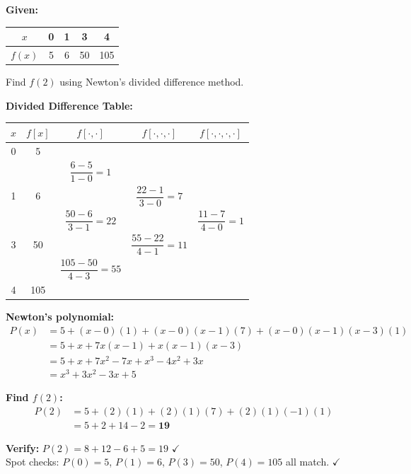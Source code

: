 \documentclass[12pt]{article}
\begin{document}
\begin{exbox}
\textbf{Given:}
\begin{center}
\begin{tabular}{|c|c|c|c|c|}
  \hline
  \rowcolor{primary!80}
  {\color{white}$x$} & {\color{white}0} & {\color{white}1} & {\color{white}3} & {\color{white}4} \\
  \hline
  $f(x)$ & 5 & 6 & 50 & 105 \\
  \hline
\end{tabular}
\end{center}
Find $f(2)$ using Newton's divided difference method.

\medskip\textbf{Divided Difference Table:}
\begin{center}
\renewcommand{\arraystretch}{1.4}
\begin{tabular}{|c|c|c|c|c|}
  \hline
  \rowcolor{primary!80}
  {\color{white}$x$} & {\color{white}$f[x]$} &
  {\color{white}$f[\cdot,\cdot]$} & {\color{white}$f[\cdot,\cdot,\cdot]$} & {\color{white}$f[\cdot,\cdot,\cdot,\cdot]$} \\
  \hline
  0 & 5 & & & \\
  \hline
  \rowcolor{lightbg!50}
  & & $\dfrac{6-5}{1-0}=1$ & & \\
  \hline
  1 & 6 & & $\dfrac{22-1}{3-0}=7$ & \\
  \hline
  \rowcolor{lightbg!50}
  & & $\dfrac{50-6}{3-1}=22$ & & $\dfrac{11-7}{4-0}=1$ \\
  \hline
  3 & 50 & & $\dfrac{55-22}{4-1}=11$ & \\
  \hline
  \rowcolor{lightbg!50}
  & & $\dfrac{105-50}{4-3}=55$ & & \\
  \hline
  4 & 105 & & & \\
  \hline
\end{tabular}
\end{center}

\textbf{Newton's polynomial:}
\begin{align*}
  P(x) &= 5 + (x-0)(1) + (x-0)(x-1)(7) + (x-0)(x-1)(x-3)(1) \\
  &= 5 + x + 7x(x-1) + x(x-1)(x-3) \\
  &= 5 + x + 7x^2 - 7x + x^3 - 4x^2 + 3x \\
  &= x^3 + 3x^2 - 3x + 5
\end{align*}

\textbf{Find $f(2)$:}
\begin{align*}
  P(2) &= 5 + (2)(1) + (2)(1)(7) + (2)(1)(-1)(1) \\
  &= 5 + 2 + 14 - 2 = \mathbf{19}
\end{align*}

\textbf{Verify:} $P(2) = 8 + 12 - 6 + 5 = 19$ $\checkmark$\\
Spot checks: $P(0)=5$, $P(1)=6$, $P(3)=50$, $P(4)=105$ all match. $\checkmark$
\end{exbox}
\end{document}

